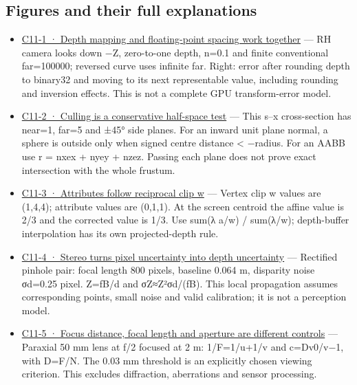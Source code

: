 \subsection{Figures and their full explanations}\label{appendix-a2b71a18f5a2-figures-and-their-full-explanations}

\hypertarget{appendix-a2b71a18f5a2-figures-and-their-full-explanations}{}

\begin{itemize}
\item
  \hyperref[02-foundations-ii-ch033-figure-c11-1-depth-mapping-and-floating-point-spacing-work-together]{C11-1 · Depth mapping and floating-point spacing work together} --- RH camera looks down −Z, zero-to-one depth, n=0.1 and finite conventional far=100000; reversed curve uses infinite far. Right: error after rounding depth to binary32 and moving to its next representable value, including rounding and inversion effects. This is not a complete GPU transform-error model.
\item
  \hyperref[02-foundations-ii-ch034-figure-c11-2-culling-is-a-conservative-half-space-test]{C11-2 · Culling is a conservative half-space test} --- This s--x cross-section has near=1, far=5 and ±45° side planes. For an inward unit plane normal, a sphere is outside only when signed centre distance \textless{} −radius. For an AABB use r = \textbar nx\textbar ex + \textbar ny\textbar ey + \textbar nz\textbar ez. Passing each plane does not prove exact intersection with the whole frustum.
\item
  \hyperref[02-foundations-ii-ch034-figure-c11-3-attributes-follow-reciprocal-clip-w]{C11-3 · Attributes follow reciprocal clip w} --- Vertex clip w values are (1,4,4); attribute values are (0,1,1). At the screen centroid the affine value is 2/3 and the corrected value is 1/3. Use sum(λ a/w) / sum(λ/w); depth-buffer interpolation has its own projected-depth rule.
\item
  \hyperref[02-foundations-ii-ch035-figure-c11-4-stereo-turns-pixel-uncertainty-into-depth-uncertainty]{C11-4 · Stereo turns pixel uncertainty into depth uncertainty} --- Rectified pinhole pair: focal length 800 pixels, baseline 0.064 m, disparity noise σd=0.25 pixel. Z=fB/d and σZ≈Z²σd/(fB). This local propagation assumes corresponding points, small noise and valid calibration; it is not a perception model.
\item
  \hyperref[02-foundations-ii-ch036-figure-c11-5-focus-distance-focal-length-and-aperture-are-different-controls]{C11-5 · Focus distance, focal length and aperture are different controls} --- Paraxial 50 mm lens at f/2 focused at 2 m: 1/F=1/u+1/v and c=D\textbar v0/v−1\textbar, with D=F/N. The 0.03 mm threshold is an explicitly chosen viewing criterion. This excludes diffraction, aberrations and sensor processing.

\end{itemize}
